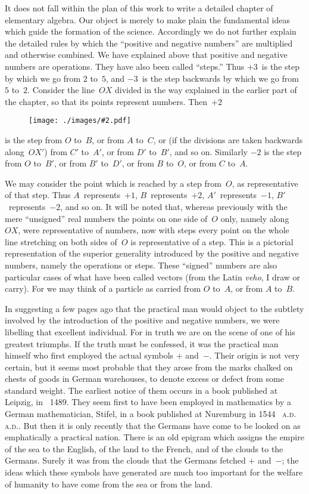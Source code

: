 \documentclass[12pt,leqno]{book}[2005/09/16]
\makeatletter
\newcommand{\Graphic}[2]{%
  \phantomsection\label{fig:#2}%
  \texttt{[image: ./images/\#2.pdf]}%
}
\newcommand{\DefWidth}{4in}%
\newcommand{\Diagram}[1]{%
  \begin{figure}[hbt!]
    \centering
    \Graphic{\DefWidth}{#1}
  \end{figure}\ignorespaces%
}
\newcommand{\PageSep}[1]{\ignorespaces}
\newcommand{\Foreign}[1]{\textit{#1}}
\newcommand{\SCAbbrev}[3]{%
  \ifthenelse{\equal{#3}{.}}%
  {\textsc{\MakeLowercase{#1.#2}.}}%
  {\textsc{\MakeLowercase{#1.#2}.}\@#3}%
}
\newcommand{\AD}[1]{\SCAbbrev{A}{D}{#1}}
\makeatother
\begin{document}
It does not fall within the plan of this work
to write a detailed chapter of elementary
algebra. Our object is merely to make plain
the fundamental ideas which guide the formation
of the science. Accordingly we do not
further explain the detailed rules by which
the ``positive and negative numbers'' are
\PageSep{84}
multiplied and otherwise combined. We have
explained above that positive and negative
numbers are operations. They have also
been called ``steps.'' Thus $+3$~is the step
by which we go from $2$ to~$5$, and $-3$~is the
step backwards by which we go from $5$ to~$2$.
Consider the line~$OX$ divided in the way explained
in the earlier part of the chapter, so
that its points represent numbers. Then~$+2$
\Diagram{pg86}
is the step from $O$ to~$B$, or from $A$ to~$C$, or
(if the divisions are taken backwards along~$OX'$)
from $C'$ to~$A'$, or from $D'$ to~$B'$, and so
on. Similarly $-2$ is the step from $O$ to~$B'$,
or from $B'$ to~$D'$, or from $B$ to~$O$, or from $C$
to~$A$.

We may consider the point which is reached
by a step from~$O$, as representative of that
step. Thus $A$~represents~$+1$, $B$~represents~$+2$,
$A'$~represents~$-1$, $B'$~represents~$-2$, and
so on. It will be noted that, whereas previously
with the mere ``unsigned'' real numbers
the points on one side of~$O$ only, namely along~$OX$,
were representative of numbers, now
with steps every point on the whole line
stretching on both sides of~$O$ is representative
of a step. This is a pictorial representation
of the superior generality introduced by the
positive and negative numbers, namely the
\PageSep{85}
operations or steps. These ``signed'' numbers
are also particular cases of what have
been called vectors (from the Latin \Foreign{veho}, I
%
draw or carry). For we may think of a
particle as carried from $O$ to~$A$, or from $A$
to~$B$.

In suggesting a few pages ago that the
practical man would object to the subtlety
involved by the introduction of the positive
and negative numbers, we were libelling that
excellent individual. For in truth we are on
the scene of one of his greatest triumphs. If
the truth must be confessed, it was the practical
man himself who first employed the actual
symbols $+$ and~$-$. Their origin is not very
certain, but it seems most probable that they
arose from the marks chalked on chests of
goods in German warehouses, to denote excess
or defect from some standard weight. The
earliest notice of them occurs in a book published
at Leipzig, in \AD~1489. They seem
first to have been employed in mathematics
by a German mathematician, Stifel, in a book
%
published at Nuremburg in 1544~\AD. But
then it is only recently that the Germans
have come to be looked on as emphatically
a practical nation. There is an old epigram
which assigns the empire of the sea to the
English, of the land to the French, and of the
clouds to the Germans. Surely it was from
the clouds that the Germans fetched $+$ and~$-$;
\PageSep{86}
the ideas which these symbols have
generated are much too important for the
welfare of humanity to have come from the
sea or from the land.
\end{document}
